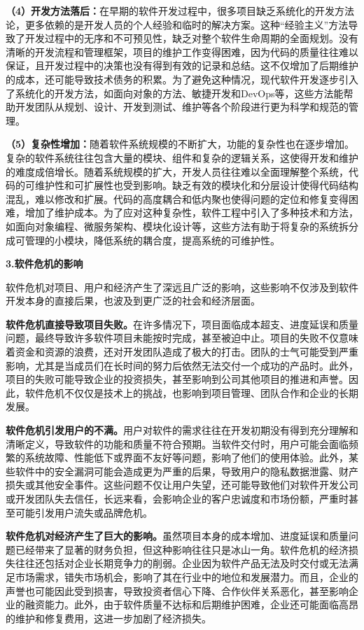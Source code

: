 \textbf{（4）开发方法落后：}在早期的软件开发过程中，很多项目缺乏系统化的开发方法论，更多依赖的是开发人员的个人经验和临时的解决方案。这种``经验主义''方法导致了开发过程中的无序和不可预见性，缺乏对整个软件生命周期的全面规划。没有清晰的开发流程和管理框架，项目的维护工作变得困难，因为代码的质量往往难以保证，且开发过程中的决策也没有得到有效的记录和总结。这不仅增加了后期维护的成本，还可能导致技术债务的积累。为了避免这种情况，现代软件开发逐步引入了系统化的开发方法，如面向对象的方法、敏捷开发和DevOps等，这些方法能帮助开发团队从规划、设计、开发到测试、维护等各个阶段进行更为科学和规范的管理。

\textbf{（5）复杂性增加：}随着软件系统规模的不断扩大，功能的复杂性也在逐步增加。复杂的软件系统往往包含大量的模块、组件和复杂的逻辑关系，这使得开发和维护的难度成倍增长。随着系统规模的扩大，开发人员往往难以全面理解整个系统，代码的可维护性和可扩展性也受到影响。缺乏有效的模块化和分层设计使得代码结构混乱，难以修改和扩展。代码的高度耦合和低内聚也使得问题的定位和修复变得困难，增加了维护成本。为了应对这种复杂性，软件工程中引入了多种技术和方法，如面向对象编程、微服务架构、模块化设计等，这些方法有助于将复杂的系统拆分成可管理的小模块，降低系统的耦合度，提高系统的可维护性。

\textbf{3.软件危机的影响}

软件危机对项目、用户和经济产生了深远且广泛的影响，这些影响不仅涉及到软件开发本身的直接后果，也波及到更广泛的社会和经济层面。

\textbf{软件危机直接导致项目失败。}在许多情况下，项目面临成本超支、进度延误和质量问题，最终导致许多软件项目未能按时完成，甚至被迫中止。项目的失败不仅意味着资金和资源的浪费，还对开发团队造成了极大的打击。团队的士气可能受到严重影响，尤其是当成员们在长时间的努力后依然无法交付一个成功的产品时。此外，项目的失败可能导致企业的投资损失，甚至影响到公司其他项目的推进和声誉。因此，软件危机不仅仅是技术上的挑战，也影响到项目管理、团队合作和企业的长期发展。

\textbf{软件危机引发用户的不满。}用户对软件的需求往往在开发初期没有得到充分理解和清晰定义，导致软件的功能和质量不符合预期。当软件交付时，用户可能会面临频繁的系统故障、性能低下或界面不友好等问题，影响了他们的使用体验。此外，某些软件中的安全漏洞可能会造成更为严重的后果，导致用户的隐私数据泄露、财产损失或其他安全事件。这些问题不仅让用户失望，还可能导致他们对软件开发公司或开发团队失去信任，长远来看，会影响企业的客户忠诚度和市场份额，严重时甚至可能引发用户流失或品牌危机。

\textbf{软件危机对经济产生了巨大的影响。}虽然项目本身的成本增加、进度延误和质量问题已经带来了显著的财务负担，但这种影响往往只是冰山一角。软件危机的经济损失往往还包括对企业长期竞争力的削弱。企业因为软件产品无法及时交付或无法满足市场需求，错失市场机会，影响了其在行业中的地位和发展潜力。而且，企业的声誉也可能因此受到损害，导致投资者信心下降、合作伙伴关系恶化，甚至影响企业的融资能力。此外，由于软件质量不达标和后期维护困难，企业还可能面临高昂的维护和修复费用，这进一步加剧了经济损失。

